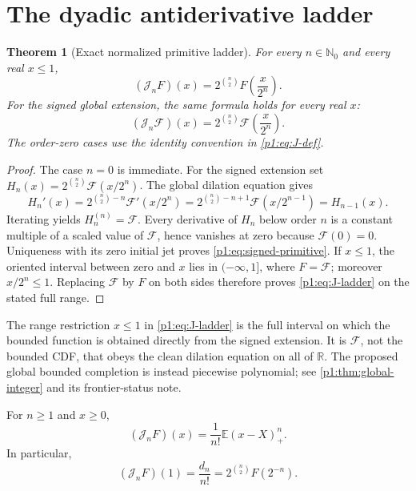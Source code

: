 \documentclass[11pt,oneside]{article}
\newtheorem{theorem}{Theorem}[section]
\theoremstyle{definition}
\theoremstyle{remark}
\newcommand{\Fs}{\mathcal F}
\newcommand{\E}{\mathbb E}
\newcommand{\R}{\mathbb R}
\newcommand{\N}{\mathbb N}
\newcommand{\Jn}{\mathcal J}
\newcommand{\1}{\mathbf 1}
\begin{document}
\section{The dyadic antiderivative ladder}

\begin{theorem}[Exact normalized primitive ladder]\label{p1:thm:ladder}
For every \(n\in\N_0\) and every real \(x\leq1\),
\begin{equation}
 \boxed{\quad
 (\Jn_nF)(x)=2^{\binom n2}F\!\left(\frac{x}{2^n}\right).
 \quad}                                                        \label{p1:eq:J-ladder}
\end{equation}
For the signed global extension, the same formula holds for every real \(x\):
\begin{equation}
 (\Jn_n\Fs)(x)=2^{\binom n2}\Fs\!\left(\frac{x}{2^n}\right).              \label{p1:eq:signed-primitive}
\end{equation}
The order-zero cases use the identity convention in \eqref{p1:eq:J-def}.
\end{theorem}

\begin{proof}
The case \(n=0\) is immediate.  For the signed extension set
\(H_n(x)=2^{\binom n2}\Fs(x/2^n)\).  The global dilation equation gives
\[
 H_n'(x)
 =2^{\binom n2-n}\Fs'(x/2^n)
 =2^{\binom n2-n+1}\Fs(x/2^{n-1})
 =H_{n-1}(x).
\]
Iterating yields \(H_n^{(n)}=\Fs\).  Every derivative of \(H_n\) below order
\(n\) is a constant multiple of a scaled value of \(\Fs\), hence vanishes at
zero because \(\Fs(0)=0\).  Uniqueness with its zero initial jet proves
\eqref{p1:eq:signed-primitive}.  If \(x\leq1\), the oriented interval between
zero and \(x\) lies in \(( -\infty,1]\), where \(F=\Fs\); moreover
\(x/2^n\leq1\).  Replacing \(\Fs\) by \(F\) on both sides therefore proves
\eqref{p1:eq:J-ladder} on the stated full range.
\end{proof}

\begin{remark}
The range restriction \(x\leq1\) in \eqref{p1:eq:J-ladder} is the full interval
on which the bounded function is obtained directly from the signed extension.
It is \(\Fs\), not the bounded CDF, that obeys the clean dilation equation on
all of \(\R\).  The proposed global bounded completion is instead piecewise
polynomial; see \cref{p1:thm:global-integer} and its frontier-status note.
\end{remark}

\begin{corollary}\label{p1:cor:J-moment}
For \(n\geq1\) and \(x\geq0\),
\begin{equation}
 (\Jn_nF)(x)=\frac1{n!}\E (x-X)_+^n.                            \label{p1:eq:J-stoploss}
\end{equation}
In particular,
\begin{equation}
 (\Jn_nF)(1)=\frac{d_n}{n!}
 =2^{\binom n2}F(2^{-n}).                                      \label{p1:eq:J-one}
\end{equation}
\end{corollary}
\end{document}
